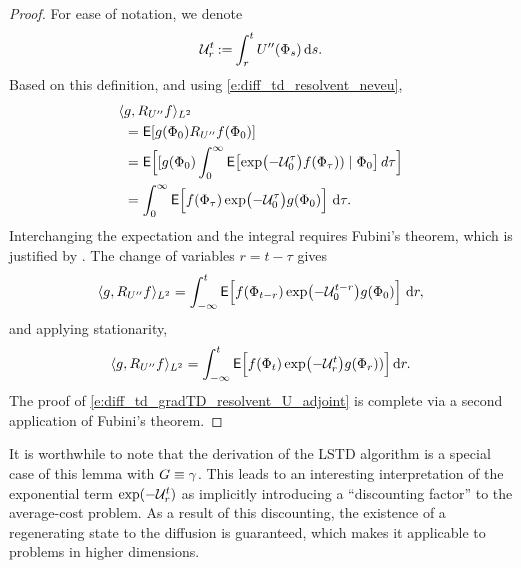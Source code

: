 \begin{proof}
	For ease of notation, we denote
	\begin{equation}
	{\cal U}_r^t \mathbin{:=} \int_{r}^{t} U''(\Phi_s) \,\textmd{d} s.
	\end{equation}
	Based on this definition,  and using \eqref{e:diff_td_resolvent_neveu},  
	\begin{equation*}
	\begin{aligned}
	\langle &g, R_{U''}   f \rangle_{L^2}
	\\
	& ={\sf E}[g(\Phi_0)R_{U''}f(\Phi_0)]
	\\
	& = {\sf E}\Bigl[  [g(\Phi_0)\int_{0}^{\infty} {\sf E}\bigl[\exp\bigl(- {\cal U}_0^\tau  \bigr)f(\Phi_\tau)) \mid \Phi_0\bigr]\,d\tau \Bigr]
	\\
	& =\int_0^\infty {\sf E}\Bigl[ f(\Phi_\tau)  \exp\bigl(- {\cal U}_0^\tau  \bigr) g(\Phi_0) \Bigr]\, \,\textmd{d}\tau.
	\end{aligned}
	\end{equation*}
	Interchanging the expectation and the integral requires Fubini's theorem, which is justified by . The change of variables $r = t - \tau$ gives
	\begin{equation}
	\langle g, R_{U''} f \rangle_{L^2} =
	\int_{-\infty}^t  {\sf E}\Bigl[ f(\Phi_{t-r})  \exp \bigl(- {\cal U}_0^{t-r} \bigr) g(\Phi_0)\Bigr]\, \,\textmd{d} r,
	\end{equation}
	and applying stationarity,
	\begin{equation}
	\langle g, R_{U''} f \rangle_{L^2} =
	\int_{-\infty}^t {\sf E}\Bigl[ f(\Phi_t) \exp\bigl(- {\cal U}_r^t \bigr) g(\Phi_r))\Bigr] \,\textmd{d} r.
	\end{equation}
	The proof of \eqref{e:diff_td_gradTD_resolvent_U_adjoint}
	is complete via a second application of Fubini's theorem.
\end{proof}

It is worthwhile to note that the derivation of the LSTD algorithm is a special case of this lemma with $G \equiv \gamma$. %
This leads to an interesting interpretation of the exponential term $\exp(-{\cal U}_r^t)$ as implicitly introducing a ``discounting factor'' to the average-cost problem. As a result of this discounting, the existence of a regenerating state to the diffusion is guaranteed, which makes it applicable to problems in higher dimensions.  %

